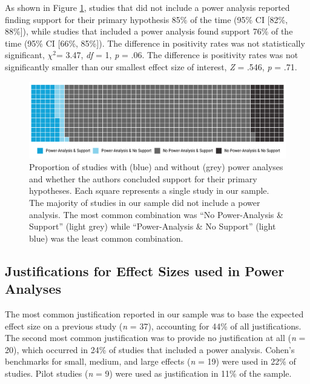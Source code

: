 \documentclass[
  man, donotrepeattitle,mask,floatsintext]{apa7}
\begin{document}
As shown in Figure \ref{fig:fig2}, studies that did not include a power analysis reported finding support for their primary hypothesis 85\% of the time (95\% CI {[}82\%, 88\%{]}), while studies that included a power analysis found support 76\% of the time (95\% CI {[}66\%, 85\%{]}). The difference in positivity rates was not statistically significant, \(\chi^2\)= 3.47, \emph{df} = 1, \emph{p} = .06. The difference is positivity rates was not significantly smaller than our smallest effect size of interest, \emph{Z} = .546, \emph{p} = .71.

\pagebreak

\begin{figure}

{\centering \includegraphics{../../figs/fig2} 

}

\caption{Proportion of studies with (blue) and without (grey) power analyses and whether the authors concluded support for their primary hypotheses. Each square represents a single study in our sample. The majority of studies in our sample did not include a power analysis. The most common combination was ``No Power-Analysis \& Support'' (light grey) while ``Power-Analysis \& No Support'' (light blue) was the least common combination.}\label{fig:fig2}
\end{figure}



\pagebreak

\hypertarget{justifications-for-effect-sizes-used-in-power-analyses}{%
\subsection{Justifications for Effect Sizes used in Power Analyses}\label{justifications-for-effect-sizes-used-in-power-analyses}}

The most common justification reported in our sample was to base the expected effect size on a previous study (\emph{n} = 37), accounting for 44\% of all justifications. The second most common justification was to provide no justification at all (\emph{n} = 20), which occurred in 24\% of studies that included a power analysis. Cohen's benchmarks for small, medium, and large effects (\emph{n} = 19) were used in 22\% of studies. Pilot studies (\emph{n} = 9) were used as justification in 11\% of the sample.
\end{document}

